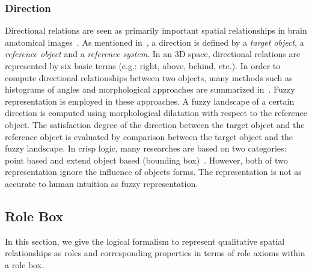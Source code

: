 \documentclass{article}
\begin{document}
\subsubsection{Direction}
Directional relations are seen as primarily important spatial relationships in brain anatomical images~\cite{Bloch2005fuzzy,Hudelot2008fuzzy,nempont2013constraint,fouquier2012sequential}.
As mentioned in~\cite{Bloch2005fuzzy}, a direction is defined by a \textit{target object}, a \textit{reference object} and a \textit{reference system}.
In an 3D space, directional relations are represented by six basic terms (e.g.: right, above, behind, etc.).
In order to compute directional relationships between two objects, many methods such as histograms of angles and morphological approaches are summarized in~\cite{Bloch2005fuzzy}.
Fuzzy representation is employed in these approaches. A fuzzy landscape of a certain direction is computed using morphological dilatation with respect to the reference object.
The satisfaction degree of the direction between the target object and the reference object is evaluated by comparison between the target object and the fuzzy landscape.
In crisp logic, many researches are based on two categories: point based and extend object based (bounding box)~\cite{chen2013survey}.
However, both of two representation ignore the influence of objects forms. The representation is not as accurate to human intuition as fuzzy representation.
% 
% 

\subsection{Role Box}
In this section, we give the logical formalism to represent qualitative spatial relationships as roles and  corresponding properties in terms of role axioms within a role box.
\end{document}
